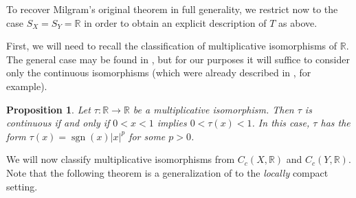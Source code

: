 \documentclass[letter,11pt]{amsart}
\theoremstyle{plain}		\newtheorem{theorem}[generalnumbering]{Theorem}
\theoremstyle{plain}		\newtheorem{corollary}[generalnumbering]{Corollary}
\theoremstyle{definition}		\newtheorem{definition}[generalnumbering]{Definition}
\theoremstyle{definition}		\newtheorem{example}[generalnumbering]{Example}
\theoremstyle{plain}		\newtheorem{proposition}[generalnumbering]{Proposition}
\theoremstyle{plain}		\newtheorem{lemma}[generalnumbering]{Lemma}
\theoremstyle{plain}    \newtheorem{plainstyle}[generalnumbering]{\namefordifferentenvironment}
\theoremstyle{plain}    \newtheorem*{plainstyle*}{\namefordifferentenvironment}
\theoremstyle{definition}    \newtheorem{definitionstyle}[generalnumbering]{\namefordifferentenvironment}
\theoremstyle{definition}    \newtheorem*{definitionstyle*}{\namefordifferentenvironment}
\begin{document}
To recover Milgram's original theorem in full generality, we restrict now to the case $S_X=S_Y=\mathbb{R}$ in order to obtain an explicit description of $T$ as above.

First, we will need to recall the classification of multiplicative isomorphisms of $\mathbb{R}$. The general case may be found in \cite[Theorem 3.1.3]{MR2467621}, but for our purposes it will suffice to consider only the continuous isomorphisms (which were already described in \cite[Lemma 4.3]{MR0029476}, for example).

\begin{proposition}\label{theoremclassificationmultiplicativeisomorphismsofr}
	Let $\tau\colon\mathbb{R}\to\mathbb{R}$ be a multiplicative isomorphism. Then $\tau$ is continuous if and only if $0<x<1$ implies $0<\tau(x)<1$. In this case, $\tau$ has the form $\tau(x)=\operatorname{sgn}(x)|x|^p$ for some $p>0$.
\end{proposition}

We will now classify multiplicative isomorphisms from $C_c(X,\mathbb{R})$ and $C_c(Y,\mathbb{R})$. Note that the following theorem is a generalization of \cite[Theorem A]{MR0029476} to the \emph{locally} compact setting.
\end{document}
